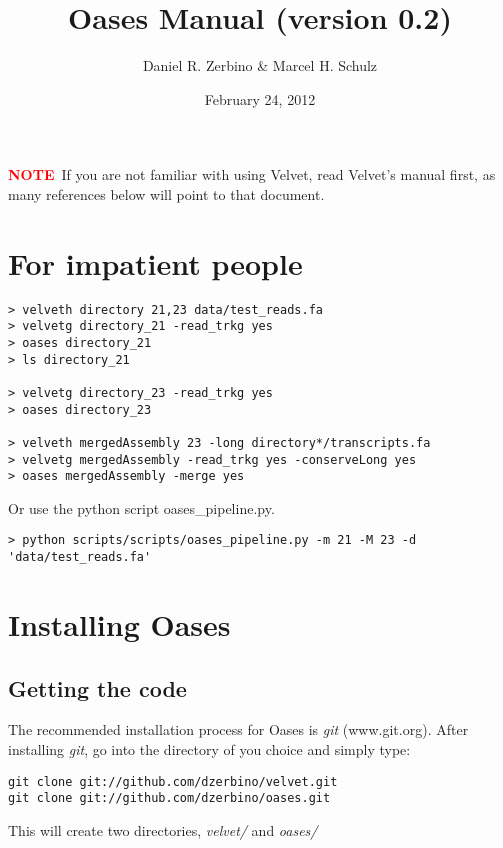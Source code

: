 \documentclass[12pt]{article}
\newcommand{\NOTE}{\textcolor{red}{\textbf{NOTE}}}
\begin{document}
\title{Oases Manual (version 0.2)}
\author{Daniel R. Zerbino \& Marcel H. Schulz}
\date{February 24, 2012}
\maketitle
\tableofcontents

\newpage

\NOTE\ If you are not familiar with using Velvet, read Velvet's manual first, as many references below will point to that document.

\section{For impatient people}
\begin{verbatim}
> velveth directory 21,23 data/test_reads.fa
> velvetg directory_21 -read_trkg yes
> oases directory_21
> ls directory_21

> velvetg directory_23 -read_trkg yes
> oases directory_23

> velveth mergedAssembly 23 -long directory*/transcripts.fa
> velvetg mergedAssembly -read_trkg yes -conserveLong yes
> oases mergedAssembly -merge yes
\end{verbatim}

Or use the python script oases\_pipeline.py.

\begin{verbatim}
> python scripts/scripts/oases_pipeline.py -m 21 -M 23 -d 'data/test_reads.fa'
\end{verbatim}

\section{Installing Oases} 

\subsection{Getting the code}

The recommended installation process for Oases is \emph{git} (www.git.org). After installing \emph{git}, go into the directory of you choice and simply type:

\begin{verbatim}
git clone git://github.com/dzerbino/velvet.git
git clone git://github.com/dzerbino/oases.git
\end{verbatim}

This will create two directories, \emph{velvet/} and \emph{oases/}
\end{document}
